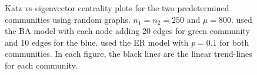 \documentclass{IEEEtran}
\begin{document}
	\begin{figure}
		\centering
		\caption{Katz vs eigenvector centrality plots for the two predetermined communities using random graphs. $n_1=n_2=250$ and $\mu=800$.  used the BA model with each node adding 20 edges for green community and 10 edges for the blue.  used the ER model with $p=0.1$ for both communities. In each figure, the black lines are the linear trend-lines for each community.}
		\label{fig:example}
	\end{figure}
\end{document}
